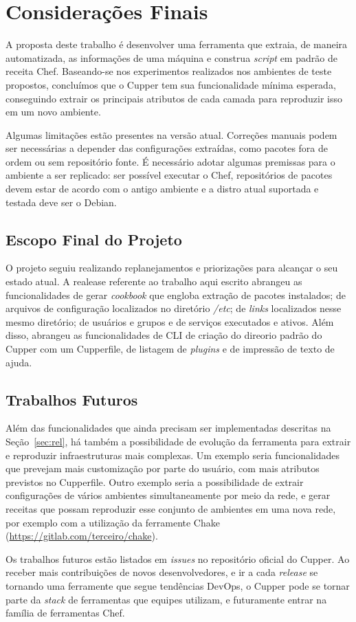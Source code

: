 \chapter{Considerações Finais}
\label{chap:conclusao}

A proposta deste trabalho é desenvolver uma ferramenta que extraia, de maneira
automatizada, as informações de uma máquina e construa \textit{script} em padrão
de receita Chef. Baseando-se nos experimentos realizados nos ambientes de teste propostos,
concluímos que o Cupper tem sua funcionalidade mínima esperada, conseguindo
extrair os principais atributos de cada camada para reproduzir isso em um novo ambiente.

Algumas limitações estão presentes na versão atual. Correções manuais podem ser necessárias
a depender das configurações extraídas, como pacotes fora de ordem ou sem repositório fonte.
É necessário adotar algumas premissas para o ambiente a ser replicado: ser possível executar
o Chef, repositórios de pacotes devem estar de acordo com o antigo ambiente e a distro atual
suportada e testada deve ser o Debian.

\section{Escopo Final do Projeto}

O projeto seguiu realizando replanejamentos e priorizações para alcançar o seu estado atual.
A realease referente ao trabalho aqui escrito abrangeu as funcionalidades de gerar 
\textit{cookbook} que engloba extração de pacotes instalados; de arquivos de configuração 
localizados no diretório \textit{/etc}; de \textit{links} localizados nesse mesmo diretório; 
de usuários e grupos e de serviços executados e ativos. Além disso, abrangeu as 
funcionalidades de CLI de criação do direorio padrão do Cupper com um Cupperfile, de listagem
de \textit{plugins} e de impressão de texto de ajuda.

\section{Trabalhos Futuros}

Além das funcionalidades que ainda precisam ser implementadas descritas na Seção~\ref{sec:rel},
há também a possibilidade de evolução da ferramenta para extrair e reproduzir
infraestruturas mais complexas. Um exemplo seria funcionalidades que
prevejam mais customização por parte do usuário, com mais atributos previstos no Cupperfile.
Outro exemplo seria a possibilidade de extrair configurações de vários ambientes simultaneamente
por meio da rede, e gerar receitas que possam reproduzir esse
conjunto de ambientes em uma nova rede, por exemplo com a utilização da ferramente Chake (\url{https://gitlab.com/terceiro/chake}).

Os trabalhos futuros estão listados em \textit{issues} no repositório oficial do Cupper.
Ao receber mais contribuições de novos desenvolvedores, e ir a cada \textit{release} se tornando
uma ferramente que segue tendências DevOps, o Cupper pode se tornar parte da \textit{stack} de ferramentas
que equipes utilizam, e futuramente entrar na família de ferramentas Chef.
